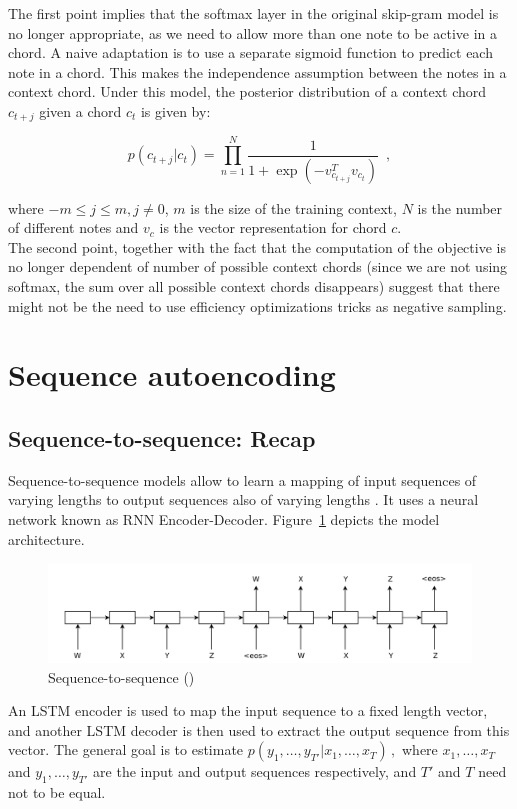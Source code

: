 \documentclass[12pt]{article}\pagestyle{myheadings}
\begin{document}
The first point implies that the softmax layer in the original skip-gram model is no longer appropriate, as we need to allow more than one note to be active in a chord. A naive adaptation is to use a separate sigmoid function to predict each note in a chord. This makes the independence assumption between the notes in a context chord.
Under this model, the posterior distribution of a context chord $c_{t+j}$ given a chord $c_t$ is given by: 

\begin{equation}
p(c_{t+j}|c_t) = \prod_{n=1}^N \frac{1}{1 + \exp(-v_{c_{t+j}}^T v_{c_t})} \,\,\,,
\end{equation}

where $-m \leq j \leq m, j\neq 0$, $m$ is the size of the training context, $N$ is the number of different notes and  $v_c$ is the vector representation for chord $c$. \\

The second point, together with the fact that the computation of the objective is no longer dependent of number of possible context chords (since we are not using softmax, the sum over all possible context chords disappears) suggest that there might not be the need to use efficiency optimizations tricks as negative sampling. 
 
 
\section{Sequence autoencoding}
\subsection{Sequence-to-sequence: Recap} 
Sequence-to-sequence models allow to learn a mapping of input sequences of varying lengths to output sequences also of varying lengths \citep{SutskeverVL14}. It uses a neural network known as RNN Encoder-Decoder. Figure~\ref{fig:seq2seq} depicts the model architecture. 
\begin{figure}[ht]
\centering
\includegraphics[width=1.0\linewidth]{figures/seq2seq.png}
\caption{\label{fig:seq2seq}Sequence-to-sequence (\citet{SutskeverVL14})}
\end{figure}
An LSTM encoder is used to map the input sequence to a fixed length vector, and another LSTM decoder is then used to extract the output sequence from this vector. The general goal is to estimate 
$
p(y_1,\ldots,y_{T'} | x_1, \ldots, x_T)\,,
$
where $x_1, \ldots, x_T$ and  $y_1,\ldots,y_{T'}$ are the input and output sequences respectively, and $T'$ and $T$ need not to be equal. 
\\
\end{document}
